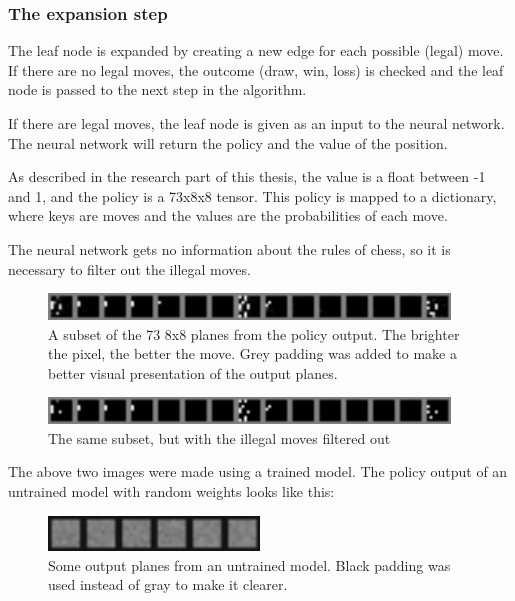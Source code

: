 \documentclass{article}
\begin{document}
\subsubsection{The expansion step}

The leaf node is expanded by creating a new edge for each possible (legal) move.
If there are no legal moves, the outcome (draw, win, loss) is checked and the leaf node
is passed to the next step in the algorithm.

If there are legal moves, the leaf node is given as an input to the neural network.
The neural network will return the policy and the value of the position.

As described in the research part of this thesis, the value is a float between -1 and 1, and the 
policy is a 73x8x8 tensor. This policy is mapped to a dictionary, where keys are moves and 
the values are the probabilities of each move. 

The neural network gets no information about the rules of chess, so it is necessary to filter
out the illegal moves. 

\begin{figure}[H]
    \centering
    \includegraphics[width=0.95\textwidth]{img/output-planes/unfiltered.png}
    \caption{A subset of the 73 8x8 planes from the policy output. The brighter the pixel, the better the move. Grey padding was added to make a better visual presentation of the output planes.}
\end{figure}

\begin{figure}[H]
    \centering
    \includegraphics[width=0.95\textwidth]{img/output-planes/filtered.png}
    \caption{The same subset, but with the illegal moves filtered out}
\end{figure}

The above two images were made using a trained model. The policy output of an untrained model with random weights 
looks like this:

\begin{figure}[H]
    \centering
    \includegraphics[width=0.5\textwidth]{img/output-planes/random-model-unfiltered.png}
    \caption{Some output planes from an untrained model. Black padding was used instead of gray to make it clearer.}
\end{figure}
\end{document}
